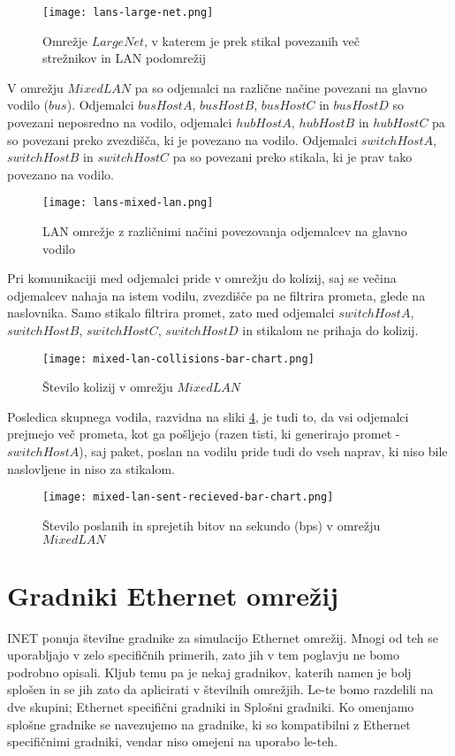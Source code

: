 \begin{figure}[H]
    \centering
    \texttt{[image: lans-large-net.png]}
    \caption{Omrežje $LargeNet$, v katerem je prek stikal povezanih več strežnikov in LAN podomrežij} 
    \label{fig:large-net}
\end{figure}

\newpage

V omrežju $MixedLAN$ pa so odjemalci na različne načine povezani na glavno vodilo ($bus$). Odjemalci $busHostA$, $busHostB$, $busHostC$ in $busHostD$ so povezani neposredno na vodilo, odjemalci $hubHostA$, $hubHostB$ in $hubHostC$ pa so povezani preko zvezdišča, ki je povezano na vodilo. Odjemalci $switchHostA$, $switchHostB$ in $switchHostC$ pa so povezani preko stikala, ki je prav tako povezano na vodilo.

\begin{figure}[H]
    \centering
    \texttt{[image: lans-mixed-lan.png]}
    \caption{LAN omrežje z različnimi načini povezovanja odjemalcev na glavno vodilo} 
    \label{fig:mixed-lan}
\end{figure}

Pri komunikaciji med odjemalci pride v omrežju do kolizij, saj se večina odjemalcev nahaja na istem vodilu, zvezdišče pa ne filtrira prometa, glede na naslovnika. Samo stikalo filtrira promet, zato med odjemalci $switchHostA$, $switchHostB$, $switchHostC$, $switchHostD$ in stikalom ne prihaja do kolizij.

\begin{figure}[H]
    \centering
    \texttt{[image: mixed-lan-collisions-bar-chart.png]}
    \caption{Število kolizij v omrežju $MixedLAN$} 
    \label{fig:mixed-lan-colisions}
\end{figure}

Posledica skupnega vodila, razvidna na sliki \ref{fig:mixed-lan-sent-recieved}, je tudi to, da vsi odjemalci prejmejo več prometa, kot ga pošljejo (razen tisti, ki generirajo promet - $switchHostA$), saj paket, poslan na vodilu pride tudi do vseh naprav, ki niso bile naslovljene in niso za stikalom.

\begin{figure}[H]
    \centering
    \texttt{[image: mixed-lan-sent-recieved-bar-chart.png]}
    \caption{Število poslanih in sprejetih bitov na sekundo (bps) v omrežju $MixedLAN$} 
    \label{fig:mixed-lan-sent-recieved}
\end{figure}

\section{Gradniki Ethernet omrežij}
INET ponuja številne gradnike za simulacijo Ethernet omrežij. Mnogi od teh se uporabljajo v zelo specifičnih primerih, zato jih v tem poglavju ne bomo podrobno opisali.
Kljub temu pa je nekaj gradnikov, katerih namen je bolj splošen in se jih zato da aplicirati v številnih omrežjih. Le-te bomo razdelili na dve skupini; Ethernet specifični gradniki in Splošni gradniki.
Ko omenjamo splošne gradnike se navezujemo na gradnike, ki so kompatibilni z Ethernet specifičnimi gradniki, vendar niso omejeni na uporabo le-teh.
